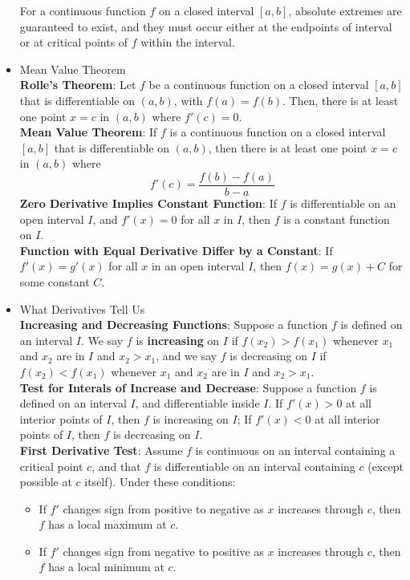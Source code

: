\documentclass{article}
\begin{document}
\begin{itemize}
    For a continuous function $f$ on a closed interval $[a, b]$, absolute extremes are guaranteed to exist, and they must occur either at the endpoints of interval or at critical points of $f$ within the interval.
    \item Mean Value Theorem \\
    \textbf{Rolle's Theorem}: Let $f$ be a continuous function on a closed interval $[a, b]$ that is differentiable on $(a, b)$, with $f(a) = f(b)$. Then, there is at least one point $x = c$ in $(a, b)$ where $f'(c) = 0$. \\
    \textbf{Mean Value Theorem}: If $f$ is a continuous function on a closed interval $[a, b]$ that is differentiable on $(a, b)$, then there is at least one point $x = c$ in $(a, b)$ where
    $$f'(c) = \frac{f(b) - f(a)}{b - a}$$
    \textbf{Zero Derivative Implies Constant Function}: If $f$ is differentiable on an open interval $I$, and $f'(x) = 0$ for all $x$ in $I$, then $f$ is a constant function on $I$. \\
    \textbf{Function with Equal Derivative Differ by a Constant}: If $f'(x) = g'(x)$ for all $x$ in an open interval $I$, then $f(x) = g(x) + C$ for some constant $C$.
    \item What Derivatives Tell Us \\
    \textbf{Increasing and Decreasing Functions}: Suppose a function $f$ is defined on an interval $I$. We say $f$ is \textbf{increasing} on $I$ if $f(x_2) > f(x_1)$ whenever $x_1$ and $x_2$ are in $I$ and $x_2 > x_1$, and we say $f$ is decreasing on $I$ if $f(x_2) < f(x_1)$ whenever $x_1$ and $x_2$ are in $I$ and $x_2 > x_1$. \\
    \textbf{Test for Interals of Increase and Decrease}: Suppose a function $f$ is defined on an interval $I$, and differentiable inside $I$. If $f'(x) > 0$ at all interior points of $I$, then $f$ is increasing on $I$; If $f'(x) < 0$ at all interior points of $I$, then $f$ is decreasing on $I$. \\
    \textbf{First Derivative Test}: Assume $f$ is continuous on an interval containing a critical point $c$, and that $f$ is differentiable on an interval containing $c$ (except possible at $c$ itself). Under these conditions:
    \begin{itemize}
        \item If $f'$ changes sign from positive to negative as $x$ increases through $c$, then $f$ has a local maximum at $c$.
        \item If $f'$ changes sign from negative to positive as $x$ increases through $c$, then $f$ has a local minimum at $c$.

\end{itemize}
\end{itemize}
\end{document}
